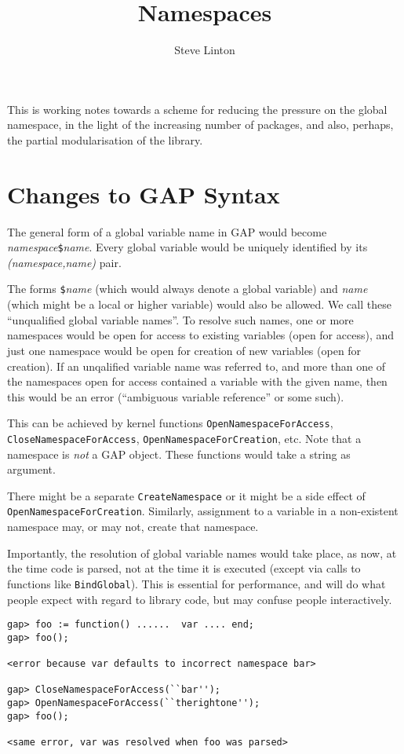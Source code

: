 \documentclass{article}
\title{Namespaces}
\author{Steve Linton}
\begin{document}
\maketitle

This is working notes towards a scheme for reducing the pressure on
the global namespace, in the light of the increasing number of
packages, and also, perhaps, the partial modularisation of the
library.

\section{Changes to GAP Syntax}

The general form of a  global variable name in GAP would become
\textit{namespace\/}\verb|$|\textit{name}. Every global variable would
be uniquely identified by its \textit{(namespace,name)} pair.

The forms \verb|$|\textit{name} (which would always denote a global
variable) and \textit{name} (which might be a local or higher
variable) would also be allowed. We call these ``unqualified global
variable names''.  To resolve such names, one or more namespaces would
be open for access to existing variables (open for access), and just one namespace would
be open for creation of new variables (open for creation). If an
unqalified variable name was referred to, and more than one of the
namespaces open for access contained a variable with the given name,
then this would be an error (``ambiguous variable reference'' or some
such).

This can be achieved by kernel functions
\verb|OpenNamespaceForAccess|, \verb|CloseNamespaceForAccess|,
\verb|OpenNamespaceForCreation|, etc. Note that a namespace is
\emph{not} a GAP object. These functions would take a string as
argument. 

There might be a separate \verb|CreateNamespace| or it might be a side
effect of \verb|OpenNamespaceForCreation|. Similarly, assignment to a
variable in a non-existent namespace may, or may not, create that namespace.

Importantly, the resolution of global variable names would take place,
as now, at the time code is parsed, not at the time it is executed
(except via calls to functions like \verb|BindGlobal|). This is
essential for performance, and will do what people expect with regard
to library code, but may confuse people interactively.

\begin{verbatim}
gap> foo := function() ......  var .... end;
gap> foo();

<error because var defaults to incorrect namespace bar>

gap> CloseNamespaceForAccess(``bar'');
gap> OpenNamespaceForAccess(``therightone'');
gap> foo();

<same error, var was resolved when foo was parsed>
\end{verbatim}
\end{document}
